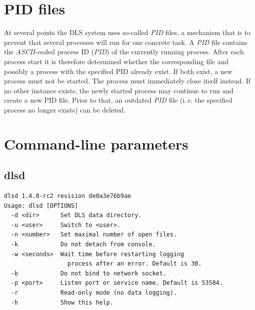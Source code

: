 \documentclass[a4paper,12pt,BCOR6mm,bibtotoc,idxtotoc]{scrbook}
\begin{document}

\chapter{PID files} \label{sec:apx_pid}

At several points the DLS system uses so-called \textit{PID} files, a mechanism that is to prevent that several processes will run for one
concrete task. A \textit{PID} file contains the \textit{ASCII}-coded process ID
(\textit{PID}) of the currently running process. After each process start it
is therefore determined whether the corresponding file and possibly a process
with the specified PID already exist. If both exist, a new process must not be
started. The process must immediately close itself instead. If no other
instance exists, the newly started process may continue to run and create a
new PID file. Prior to that, an outdated \textit{PID} file (i.\,e. the
specified process no longer exists) can be deleted.


\chapter{Command-line parameters}


\section{dlsd}

\begin{lstlisting}
dlsd 1.4.0-rc2 revision de0a3e76b9ae
Usage: dlsd [OPTIONS]
  -d <dir>      Set DLS data directory.
  -u <user>     Switch to <user>.
  -n <number>   Set maximal number of open files.
  -k            Do not detach from console.
  -w <seconds>  Wait time before restarting logging
                  process after an error. Default is 30.
  -b            Do not bind to network socket.
  -p <port>     Listen port or service name. Default is 53584.
  -r            Read-only mode (no data logging).
  -h            Show this help.
\end{lstlisting}

\end{document}

